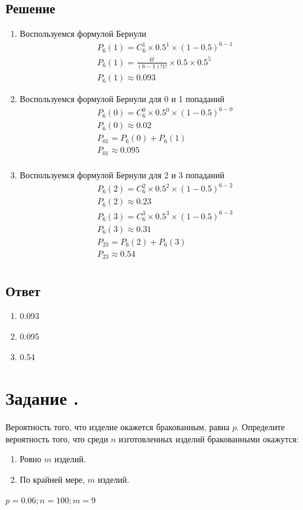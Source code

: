 \documentclass[12pt]{article}
\begin{document}
\subsection*{Решение}
\begin{enumerate}
	\item Воспользуемся формулой Бернули
	      \begin{gather*}
		      P_6(1) = C_6^1 \times 0.5^1 \times (1 - 0.5)^{6-1} \\
		      P_6(1) = \frac{6!}{(6-1)!1!} \times 0.5 \times 0.5^5 \\
		      P_6(1) \approx 0.093
	      \end{gather*}
	\item Воспользуемся формулой Бернули для 0 и 1 попаданий
	      \begin{gather*}
		      P_6(0) = C_6^0 \times 0.5^0 \times (1 - 0.5)^{6 - 0} \\
		      P_6(0) \approx 0.02  \\
		      P_{01} = P_6(0) + P_6(1) \\
		      P_{01} \approx 0.095 \\
	      \end{gather*}
	\item Воспользуемся формулой Бернули для 2 и 3 попаданий
	      \begin{gather*}
		      P_6(2) = C_6^2 \times 0.5^2 \times (1 - 0.5)^{6 - 2} \\
		      P_6(2) \approx 0.23  \\
		      P_6(3) = C_6^3 \times 0.5^3 \times (1 - 0.5)^{6 - 3} \\
		      P_6(3) \approx 0.31  \\
		      P_{23} = P_6(2) + P_6(3) \\
		      P_{23} \approx 0.54 \\
	      \end{gather*}
\end{enumerate}
\subsection*{Ответ}
\begin{enumerate}
	\item 0.093
	\item 0.095
	\item 0.54
\end{enumerate}

\section*{Задание .}
Вероятность того, что изделие окажется бракованным, равна $p$. Определите вероятность того, что среди $n$ изготовленных изделий бракованными окажутся:
\begin{enumerate}
	\item Ровно $m$ изделий.
	\item По крайней мере, $m$ изделий.
\end{enumerate}
$p = 0.06; n=100; m=9$
\end{document}
